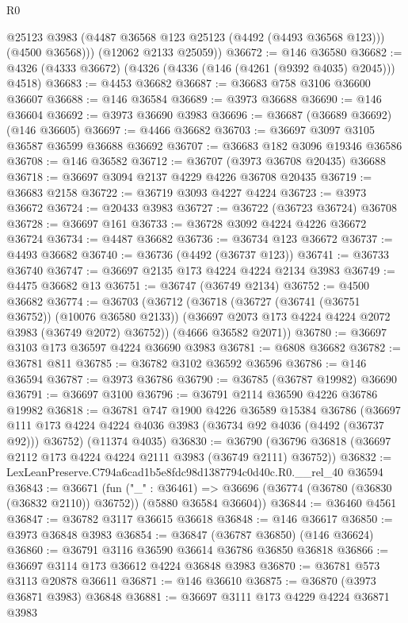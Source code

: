 \begin{lexlean}{R0}
\begin{coremodule}
          @25123
          @3983
          (@4487 @36568 @123 @25123 (@4492 (@4493 @36568 @123)))
          (@4500 @36568)))
      (@12062 @2133 @25059))
@36672 := @146 @36580
@36682 := @4326 (@4333 @36672) (@4326 (@4336 (@146 (@4261 (@9392 @4035) @2045))) @4518)
@36683 := @4453 @36682
@36687 := @36683 @758 @3106 @36600 @36607
@36688 := @146 @36584
@36689 := @3973 @36688
@36690 := @146 @36604
@36692 := @3973 @36690 @3983
@36696 := @36687 (@36689 @36692) (@146 @36605)
@36697 := @4466 @36682
@36703 := @36697 @3097 @3105 @36587 @36599 @36688 @36692
@36707 := @36683 @182 @3096 @19346 @36586
@36708 := @146 @36582
@36712 := @36707 (@3973 @36708 @20435) @36688
@36718 := @36697 @3094 @2137 @4229 @4226 @36708 @20435
@36719 := @36683 @2158
@36722 := @36719 @3093 @4227 @4224
@36723 := @3973 @36672
@36724 := @20433 @3983
@36727 := @36722 (@36723 @36724) @36708
@36728 := @36697 @161
@36733 := @36728 @3092 @4224 @4226 @36672 @36724
@36734 := @4487 @36682
@36736 := @36734 @123 @36672
@36737 := @4493 @36682
@36740 := @36736 (@4492 (@36737 @123))
@36741 := @36733 @36740
@36747 := @36697 @2135 @173 @4224 @4224 @2134 @3983
@36749 := @4475 @36682 @13
@36751 := @36747 (@36749 @2134)
@36752 := @4500 @36682
@36774 := @36703
    (@36712
      (@36718
        (@36727 (@36741 (@36751 @36752)) (@10076 @36580 @2133))
        (@36697 @2073 @173 @4224 @4224 @2072 @3983 (@36749 @2072) @36752))
      (@4666 @36582 @2071))
@36780 := @36697 @3103 @173 @36597 @4224 @36690 @3983
@36781 := @6808 @36682
@36782 := @36781 @811
@36785 := @36782 @3102 @36592 @36596
@36786 := @146 @36594
@36787 := @3973 @36786
@36790 := @36785 (@36787 @19982) @36690
@36791 := @36697 @3100
@36796 := @36791 @2114 @36590 @4226 @36786 @19982
@36818 := @36781
    @747
    @1900
    @4226
    @36589
    @15384
    @36786
    (@36697 @111 @173 @4224 @4224 @4036 @3983 (@36734 @92 @4036 (@4492 (@36737 @92))) @36752)
    (@11374 @4035)
@36830 := @36790 (@36796 @36818 (@36697 @2112 @173 @4224 @4224 @2111 @3983 (@36749 @2111) @36752))
@36832 := LexLeanPreserve.C794a6cad1b5e8fdc98d1387794c0d40c.R0.__rel_40 @36594
@36843 := @36671
    (fun ("_" : @36461) =>
    @36696 (@36774 (@36780 (@36830 (@36832 @2110)) @36752)) (@5880 @36584 @36604))
@36844 := @36460 @4561
@36847 := @36782 @3117 @36615 @36618
@36848 := @146 @36617
@36850 := @3973 @36848 @3983
@36854 := @36847 (@36787 @36850) (@146 @36624)
@36860 := @36791 @3116 @36590 @36614 @36786 @36850 @36818
@36866 := @36697 @3114 @173 @36612 @4224 @36848 @3983
@36870 := @36781 @573 @3113 @20878 @36611
@36871 := @146 @36610
@36875 := @36870 (@3973 @36871 @3983) @36848
@36881 := @36697 @3111 @173 @4229 @4224 @36871 @3983

\end{coremodule}
\end{lexlean}

